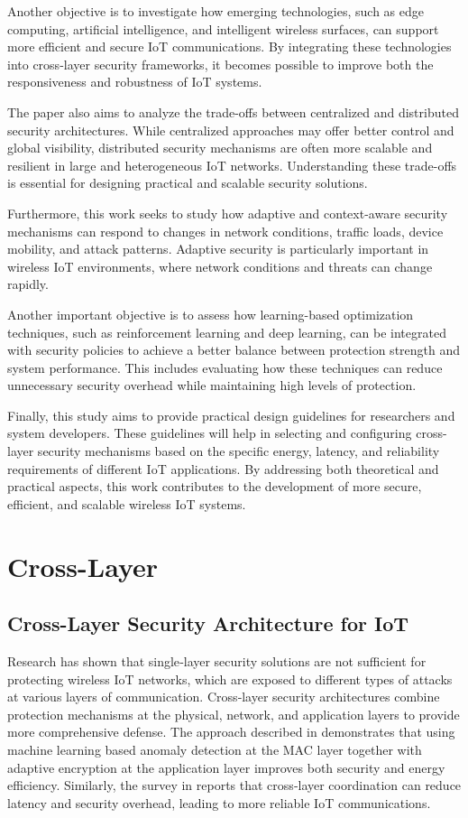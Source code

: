 \documentclass[a4paper,fleqn]{cas-dc}
\numberwithin{equation}{section}
\begin{document}
Another objective is to investigate how emerging technologies, such as edge computing, artificial intelligence, and intelligent wireless surfaces, can support more efficient and secure IoT communications. By integrating these technologies into cross-layer security frameworks, it becomes possible to improve both the responsiveness and robustness of IoT systems.

The paper also aims to analyze the trade-offs between centralized and distributed security architectures. While centralized approaches may offer better control and global visibility, distributed security mechanisms are often more scalable and resilient in large and heterogeneous IoT networks. Understanding these trade-offs is essential for designing practical and scalable security solutions.

Furthermore, this work seeks to study how adaptive and context-aware security mechanisms can respond to changes in network conditions, traffic loads, device mobility, and attack patterns. Adaptive security is particularly important in wireless IoT environments, where network conditions and threats can change rapidly.

Another important objective is to assess how learning-based optimization techniques, such as reinforcement learning and deep learning, can be integrated with security policies to achieve a better balance between protection strength and system performance. This includes evaluating how these techniques can reduce unnecessary security overhead while maintaining high levels of protection.

Finally, this study aims to provide practical design guidelines for researchers and system developers. These guidelines will help in selecting and configuring cross-layer security mechanisms based on the specific energy, latency, and reliability requirements of different IoT applications. By addressing both theoretical and practical aspects, this work contributes to the development of more secure, efficient, and scalable wireless IoT systems.


\section{Cross-Layer}

\subsection{Cross-Layer Security Architecture for IoT}

Research has shown that single‐layer security solutions are not sufficient for protecting wireless IoT networks, which are exposed to different types of attacks at various layers of communication. Cross‐layer security architectures combine protection mechanisms at the physical, network, and application layers to provide more comprehensive defense. The approach described in \cite{musaddiq2020rl} demonstrates that using machine learning based anomaly detection at the MAC layer together with adaptive encryption at the application layer improves both security and energy efficiency. Similarly, the survey in \cite{kaur2024ris2} reports that cross‐layer coordination can reduce latency and security overhead, leading to more reliable IoT communications.
\end{document}
